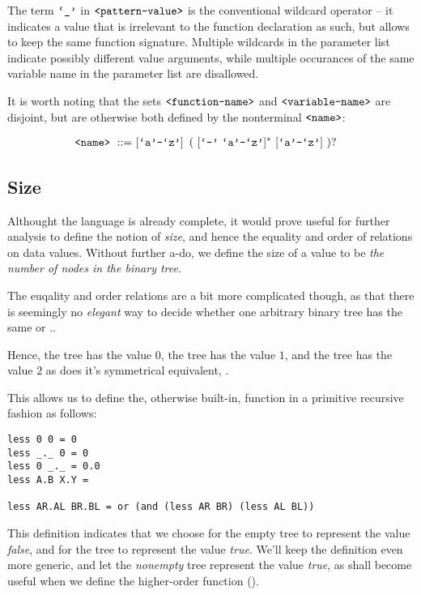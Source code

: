 The term $\text{{\ttfamily`\_'}}$ in $\text{{\ttfamily<pattern-value>}}$ is the conventional wildcard
operator -- it indicates a value that is irrelevant to the function declaration
as such, but allows to keep the same function signature. Multiple wildcards in
the parameter list indicate possibly different value arguments, while multiple
occurances of the same variable name in the parameter list are disallowed.

It is worth noting that the sets $\text{{\ttfamily<function-name>}}$ and
$\text{{\ttfamily<variable-name>}}$ are disjoint, but are otherwise both defined by the
nonterminal $\text{{\ttfamily<name>}}$:

\begin{align}
\text{{\ttfamily<name>}}\ ::=&\ [\text{{\ttfamily`a'}}\text{{\ttfamily-}}\text{{\ttfamily`z'}}]
\ \left (\ [\text{{\ttfamily`-'}}\ \text{{\ttfamily`a'}}\text{{\ttfamily-}}\text{{\ttfamily`z'}}]^*
\ [\text{{\ttfamily`a'}}\text{{\ttfamily-}}\text{{\ttfamily`z'}}]\ \right )?
\end{align}

\subsection{Size}

Althought the language is already complete, it would prove useful for further
analysis to define the notion of \emph{size}, and hence the equality and order
of relations on data values. Without further a-do, we define the size of a
value to be \emph{the number of nodes in the binary tree}.

The euqality and order relations are a bit more complicated though, as that
there is seemingly no \emph{elegant} way to decide whether one arbitrary binary
tree has the same or ..

Hence, the tree  has the value $0$, the tree  has the value
$1$, and the tree  has the value $2$ as does it's symmetrical
equivalent, .

This allows us to define the, otherwise built-in, function  in a
primitive recursive fashion as follows:

\begin{verbatim}
less 0 0 = 0
less _._ 0 = 0
less 0 _._ = 0.0
less A.B X.Y = 

less AR.AL BR.BL = or (and (less AR BR) (less AL BL))
\end{verbatim}

This definition indicates that we choose for the empty tree to represent the
value \emph{false}, and for the tree  to represent the value
\emph{true}. We'll keep the definition even more generic, and let the
\emph{nonempty} tree represent the value \emph{true}, as shall become useful
when we define the higher-order function 
().

